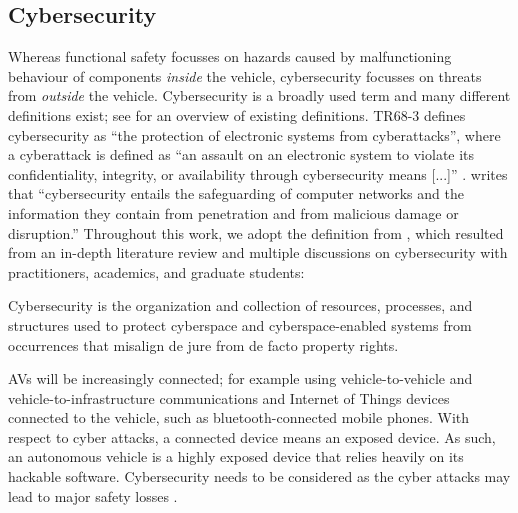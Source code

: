 \subsection{Cybersecurity}
\label{sec:cybersecurity}

Whereas functional safety focusses on hazards caused by malfunctioning behaviour of components \emph{inside} the vehicle, cybersecurity focusses on threats from \emph{outside} the vehicle. Cybersecurity is a broadly used term and many different definitions exist; see \cite{craigen2014defining} for an overview of existing definitions. TR68-3 \cite[p.~9]{tr68cybersecurity} defines cybersecurity as ``the protection of electronic systems from cyberattacks'', where a cyberattack is defined as ``an assault on an electronic system to violate its confidentiality, integrity, or availability through cybersecurity means [...]'' \cite[p.~9]{tr68cybersecurity}. \textcite[p.~1]{lewis2006cybersecurity} writes that ``cybersecurity entails the safeguarding of computer networks and the information they contain from penetration and from malicious damage or disruption.'' Throughout this work, we adopt the definition from \textcite{craigen2014defining}, which resulted from an in-depth literature review and multiple discussions on cybersecurity with practitioners, academics, and graduate students:

\begin{definition}
	Cybersecurity is the organization and collection of resources, processes, and structures used to protect cyberspace and cyberspace-enabled systems from occurrences that misalign \textup{de jure} from \textup{de facto} property rights.
\end{definition}

AVs will be increasingly connected; for example using vehicle-to-vehicle and vehicle-to-infrastructure communications and Internet of Things devices connected to the vehicle, such as bluetooth-connected mobile phones. With respect to cyber attacks, a connected device means an exposed device. As such, an autonomous vehicle is a highly exposed device that relies heavily on its hackable software. Cybersecurity needs to be considered as the cyber attacks may lead to major safety losses \cite{hashemeiza2017sharks}.

